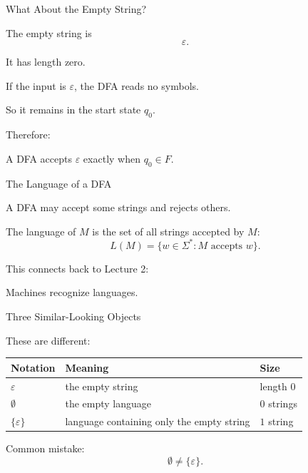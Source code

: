 \documentclass[10pt,aspectratio=169]{beamer}
\newcommand{\eps}{\varepsilon}
\begin{document}
\begin{frame}{What About the Empty String?}

The empty string is
\[
\eps.
\]

It has length zero.

\pause

If the input is $\eps$, the DFA reads no symbols.

\pause

So it remains in the start state $q_0$.

\pause

Therefore:

\begin{center}
A DFA accepts $\eps$ exactly when $q_0\in F$.
\end{center}

\end{frame}

\begin{frame}{The Language of a DFA}

A DFA may accept some strings and rejects others.

\pause

The language of $M$ is the set of all strings accepted by $M$:
\[
L(M)=\{w\in\Sigma^*: M\text{ accepts }w\}.
\]

\pause

This connects back to Lecture 2:

\begin{center}
Machines recognize languages.
\end{center}

\end{frame}

\begin{frame}{Three Similar-Looking Objects}

These are different:

\vspace{0.5em}

\begin{center}
\begin{tabular}{lll}
\toprule
\textbf{Notation} & \textbf{Meaning} & \textbf{Size}\\
\midrule
$\eps$ & the empty string & length $0$\\
$\emptyset$ & the empty language & $0$ strings\\
$\{\eps\}$ & language containing only the empty string & $1$ string\\
\bottomrule
\end{tabular}
\end{center}

\pause

\vspace{1em}

Common mistake:
\[
\emptyset \ne \{\eps\}.
\]

\end{frame}
\end{document}
